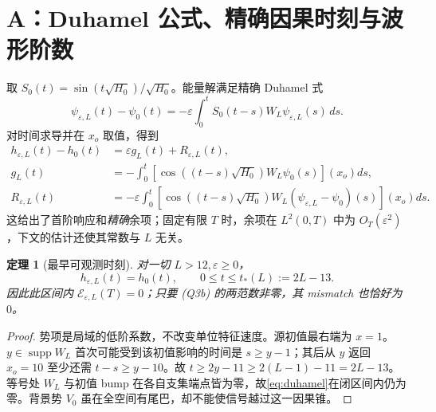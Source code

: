 \documentclass[UTF8,a4paper,11pt]{ctexart}
\newtheorem{theorem}{定理}
\DeclareMathOperator{\supp}{supp}
\newcommand{\ee}{\varepsilon}
\begin{document}
\section{A：Duhamel 公式、精确因果时刻与波形阶数}
取 $S_0(t)=\sin(t\sqrt{H_0})/\sqrt{H_0}$。能量解满足精确 Duhamel 式
\begin{equation}\label{eq:duhamel}
 \psi_{\ee,L}(t)-\psi_0(t)
 =-\ee\int_0^t S_0(t-s)W_L\psi_{\ee,L}(s)\,ds.
\end{equation}
对时间求导并在 $x_o$ 取值，得到
\begin{align}
 h_{\ee,L}(t)-h_0(t)&=\ee g_L(t)+R_{\ee,L}(t),\label{eq:born}\\
 g_L(t)&=-\int_0^t
 \left[\cos((t-s)\sqrt{H_0})W_L\psi_0(s)\right](x_o)ds,\label{eq:g}\\
 R_{\ee,L}(t)&=-\ee\int_0^t
 \left[\cos((t-s)\sqrt{H_0})W_L
 (\psi_{\ee,L}-\psi_0)(s)\right](x_o)ds.\label{eq:remainder}
\end{align}
这给出了首阶响应和\emph{精确}余项；固定有限 $T$ 时，余项在 $L^2(0,T)$ 中为 $O_T(\ee^2)$，下文的估计还使其常数与 $L$ 无关。

\begin{theorem}[最早可观测时刻]\label{thm:causality}
对一切 $L>12,\ee\geq0$，
\begin{equation}\label{eq:onset}
 h_{\ee,L}(t)=h_0(t),\qquad 0\leq t\leq t_*(L):=2L-13.
\end{equation}
因此此区间内 $\mathcal E_{\ee,L}(T)=0$；只要 (Q3b) 的两范数非零，其 mismatch 也恰好为 $0$。
\end{theorem}
\begin{proof}
势项是局域的低阶系数，不改变单位特征速度。源初值最右端为 $x=1$。$y\in\supp W_L$ 首次可能受到该初值影响的时间是 $s\geq y-1$；其后从 $y$ 返回 $x_o=10$ 至少还需 $t-s\geq y-10$。故
$t\geq2y-11\geq2(L-1)-11=2L-13$。
等号处 $W_L$ 与初值 bump 在各自支集端点皆为零，故\eqref{eq:duhamel}在闭区间内仍为零。背景势 $V_0$ 虽在全空间有尾巴，却不能使信号越过这一因果锥。
\end{proof}
\end{document}
